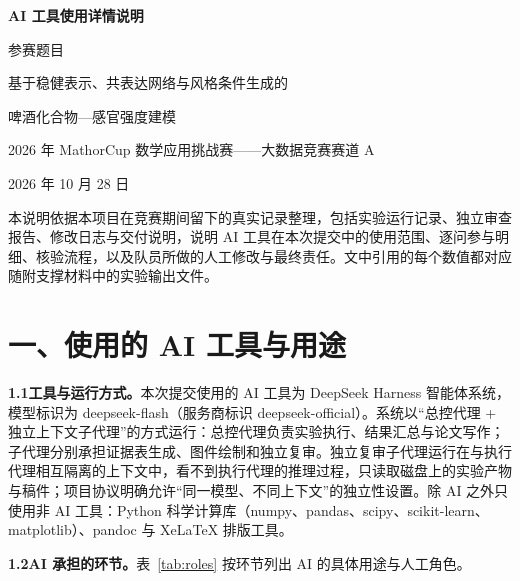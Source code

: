 \documentclass[11pt,a4paper]{article}
\begin{document}
\begin{titlepage}
\centering
\vspace*{2.1cm}
{\Huge\bfseries AI 工具使用详情说明\par}
\vspace{1.7cm}
{\large 参赛题目\par}
\vspace{0.7cm}
{\Large 基于稳健表示、共表达网络与风格条件生成的\par}
\vspace{0.4cm}
{\Large 啤酒化合物—感官强度建模\par}
\vspace{1.9cm}
{\large 2026 年 MathorCup 数学应用挑战赛——大数据竞赛\quad 赛道 A\par}
\vspace{0.6cm}
{\large 2026 年 10 月 28 日\par}
\vfill
\end{titlepage}
\setcounter{page}{1}

本说明依据本项目在竞赛期间留下的真实记录整理，包括实验运行记录、独立审查报告、修改日志与交付说明，说明 AI 工具在本次提交中的使用范围、逐问参与明细、核验流程，以及队员所做的人工修改与最终责任。文中引用的每个数值都对应随附支撑材料中的实验输出文件。

\section*{一、使用的 AI 工具与用途}

\textbf{1.1\quad 工具与运行方式。}\quad 本次提交使用的 AI 工具为 DeepSeek Harness 智能体系统，模型标识为 deepseek-flash（服务商标识 deepseek-official）。系统以“总控代理 + 独立上下文子代理”的方式运行：总控代理负责实验执行、结果汇总与论文写作；子代理分别承担证据表生成、图件绘制和独立复审。独立复审子代理运行在与执行代理相互隔离的上下文中，看不到执行代理的推理过程，只读取磁盘上的实验产物与稿件；项目协议明确允许“同一模型、不同上下文”的独立性设置。除 AI 之外只使用非 AI 工具：Python 科学计算库（numpy、pandas、scipy、scikit-learn、matplotlib）、pandoc 与 XeLaTeX 排版工具。

\textbf{1.2\quad AI 承担的环节。}\quad 表~\ref{tab:roles} 按环节列出 AI 的具体用途与人工角色。
\end{document}
